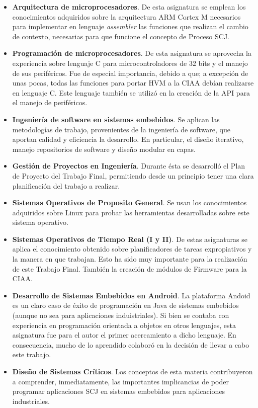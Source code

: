 \begin{itemize}
\item
\textbf{Arquitectura de microprocesadores}. De esta asignatura se emplean los conocimientos adquiridos sobre la arquitectura ARM Cortex M necesarios para implementar en lenguaje \textit{assembler} las funciones que realizan el cambio de contexto, necesarias para que funcione el concepto de Proceso SCJ. 
\item
\textbf{Programación de microprocesadores}. De esta asignatura se aprovecha la experiencia sobre lenguaje C para microcontroladores de 32 bits y el manejo de sus periféricos. Fue de especial importancia, debido a que; a excepción de unas pocas, todas las funciones para portar HVM a la CIAA debían realizarse en lenguaje C. Este lenguaje también se utilizó en la creación de  la API para el manejo de periféricos.
\item
\textbf{Ingeniería de software en sistemas embebidos}. Se aplican las metodologías de trabajo, provenientes de la ingeniería de software, que aportan calidad y eficiencia la desarrollo. En particular, el diseño iterativo, manejo repositorios de software y diseño modular en capas.
\item
\textbf{Gestión de Proyectos en Ingeniería}. Durante ésta se desarrolló el Plan de Proyecto del Trabajo Final, permitiendo desde un principio tener una clara planificación del trabajo a realizar. 
\item
\textbf{Sistemas Operativos de Proposito General}. Se usan los conocimientos adquiridos sobre Linux para probar las herramientas desarrolladas sobre este sistema operativo.
\item
\textbf{Sistemas Operativos de Tiempo Real (I y II)}. De estas asignaturas se aplica el conocimiento obtenido sobre planificadores de tareas expropiativos y la manera en que trabajan. Esto ha sido muy importante para la realización de este Trabajo Final. También la creación de módulos de Firmware para la CIAA.
\item
\textbf{Desarrollo de Sistemas Embebidos en Android}. La plataforma Andoid es un claro caso de éxito de programación en Java de sistemas embebidos (aunque no sea para aplicaciones induistriales). Si bien se contaba con experiencia en programación orientada a objetos en otros lenguajes, esta asignatura fue para el autor el primer acercamiento a dicho lenguaje. En consecuencia, mucho de lo aprendido colaboró en la decisión de llevar a cabo este trabajo.
\item
\textbf{Diseño de Sistemas Críticos}. Los conceptos de esta materia contribuyeron a comprender, inmediatamente, las importantes implicancias de poder programar aplicaciones SCJ en sistemas embebidos para aplicaciones industriales.
\end{itemize}

